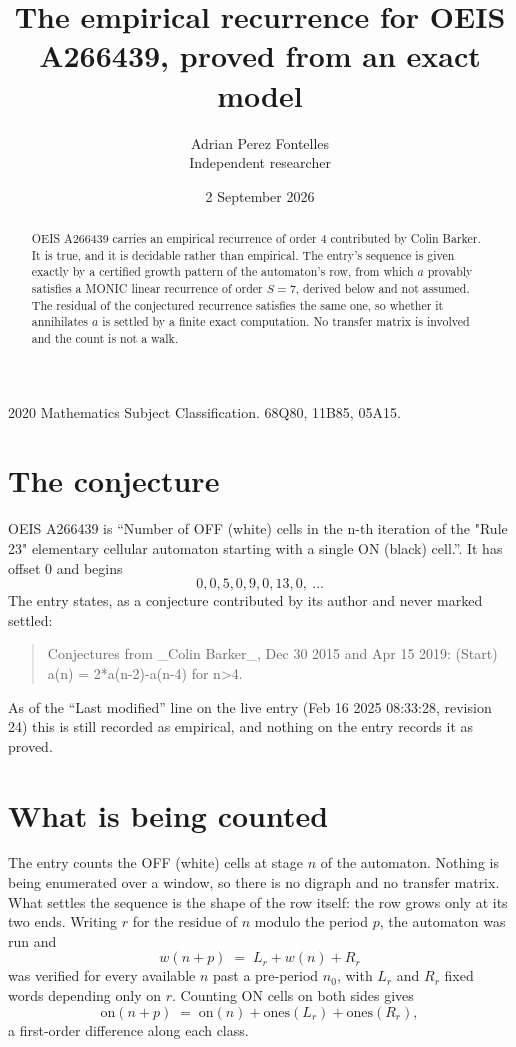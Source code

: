 \documentclass[11pt,a4paper]{article}
\title{The empirical recurrence for OEIS A266439, proved from an exact model}
\author{Adrian Perez Fontelles\\ \small Independent researcher}
\date{2 September 2026}
\theoremstyle{plain}
\theoremstyle{definition}
\begin{document}
\maketitle

\begin{abstract}
OEIS A266439 carries an empirical recurrence of order $4$ contributed by Colin Barker. It is true, and it is
decidable rather than empirical. The entry's sequence is given exactly by a certified growth pattern of the automaton's row, from
which $a$ provably satisfies a MONIC linear recurrence of order $S=7$, derived below and not
assumed. The residual of the conjectured recurrence satisfies the same one, so whether it
annihilates $a$ is settled by a finite exact computation. No transfer matrix is involved and
the count is not a walk.
\end{abstract}

\noindent\small 2020 Mathematics Subject Classification. 68Q80, 11B85, 05A15.\normalsize

\section{The conjecture}

OEIS A266439 is ``Number of OFF (white) cells in the n-th iteration of the "Rule 23" elementary cellular automaton starting with a single ON (black) cell.''. It has offset $0$ and begins
\[
0, 0, 5, 0, 9, 0, 13, 0,\ \dots
\]
The entry states, as a conjecture contributed by its author and never marked settled:
\begin{quote}
Conjectures from \_Colin Barker\_, Dec 30 2015 and Apr 15 2019: (Start) a(n) = 2*a(n-2)-a(n-4) for n>4.
\end{quote}
As of the ``Last modified'' line on the live entry (Feb 16 2025 08:33:28, revision 24)
this is still recorded as empirical, and nothing on the entry records it as proved.

\section{What is being counted}

The entry counts the OFF (white) cells at stage $n$ of the automaton. Nothing is being enumerated over a window, so there is
no digraph and no transfer matrix. What settles the sequence is the shape of the row itself:
the row grows only at its two ends. Writing
$r$ for the residue of $n$ modulo the period $p$, the automaton was run and
\[
w(n+p)\;=\;L_r + w(n) + R_r
\]
was verified for every available $n$ past a
pre-period $n_0$, with $L_r$ and $R_r$ fixed words depending only on $r$. Counting ON cells on
both sides gives
\[
\mathrm{on}(n+p)\;=\;\mathrm{on}(n)+\mathrm{ones}(L_r)+\mathrm{ones}(R_r),
\]
a first-order difference along each class.
\end{document}
